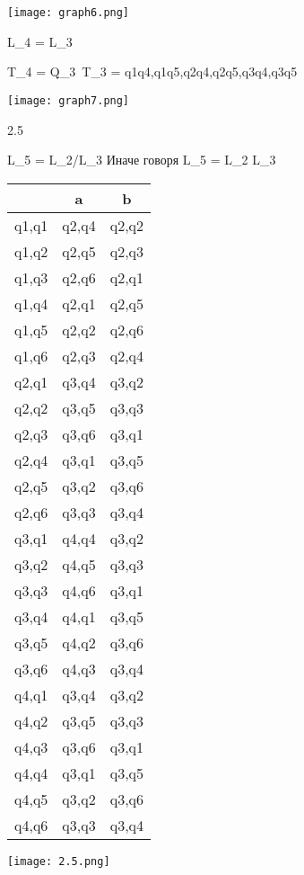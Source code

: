 \documentclass{article}
\begin{document}
\texttt{[image: graph6.png]}


L_4 = \neg L_3

T_4 = Q_3\ T_3 = q1q4,q1q5,q2q4,q2q5,q3q4,q3q5

\texttt{[image: graph7.png]}

2.5

L_5 = L_2/L_3
Иначе говоря L_5 = L_2 \cap L_3

\begin{tabular}{ | c | c | c | }
\hline
 & a & b  \\ \hline
q1,q1 & q2,q4 & q2,q2 \\ \hline
q1,q2 & q2,q5 & q2,q3 \\ \hline
q1,q3 & q2,q6 & q2,q1 \\ \hline
q1,q4 & q2,q1 & q2,q5 \\ \hline
q1,q5 & q2,q2 & q2,q6 \\ \hline
q1,q6 & q2,q3 & q2,q4 \\ \hline
q2,q1 & q3,q4 & q3,q2 \\ \hline
q2,q2 & q3,q5 & q3,q3 \\ \hline
q2,q3 & q3,q6 & q3,q1 \\ \hline
q2,q4 & q3,q1 & q3,q5 \\ \hline
q2,q5 & q3,q2 & q3,q6 \\ \hline
q2,q6 & q3,q3 & q3,q4 \\ \hline
q3,q1 & q4,q4 & q3,q2 \\ \hline
q3,q2 & q4,q5 & q3,q3 \\ \hline
q3,q3 & q4,q6 & q3,q1 \\ \hline
q3,q4 & q4,q1 & q3,q5 \\ \hline
q3,q5 & q4,q2 & q3,q6 \\ \hline
q3,q6 & q4,q3 & q3,q4 \\ \hline
q4,q1 & q3,q4 & q3,q2 \\ \hline
q4,q2 & q3,q5 & q3,q3 \\ \hline
q4,q3 & q3,q6 & q3,q1 \\ \hline
q4,q4 & q3,q1 & q3,q5 \\ \hline
q4,q5 & q3,q2 & q3,q6 \\ \hline
q4,q6 & q3,q3 & q3,q4 \\ \hline
\end{tabular}


\texttt{[image: 2.5.png]}
\end{document}
